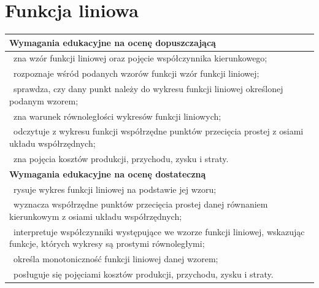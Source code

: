 \documentclass[12pt,a4paper]{article}
\begin{document}
	\section{Funkcja liniowa}
	
	\begin{longtable}{|p{16cm}|}
		\hline
		
		\textbf{Wymagania edukacyjne na ocenę dopuszczającą} \\ \hline
		
		\textbullet\ zna wzór funkcji liniowej oraz pojęcie współczynnika kierunkowego; \\
		
		\textbullet\ rozpoznaje wśród podanych wzorów funkcji wzór funkcji liniowej; \\
		
		\textbullet\ sprawdza, czy dany punkt należy do wykresu funkcji liniowej określonej podanym wzorem; \\
		
		\textbullet\ zna warunek równoległości wykresów funkcji liniowych; \\
		
		\textbullet\ odczytuje z wykresu funkcji współrzędne punktów przecięcia prostej z osiami układu współrzędnych; \\
		
		\textbullet\ zna pojęcia kosztów produkcji, przychodu, zysku i straty. \\ \hline
		
		\textbf{Wymagania edukacyjne na ocenę dostateczną} \\ \hline
		
		\textbullet\ rysuje wykres funkcji liniowej na podstawie jej wzoru; \\
		
		\textbullet\ wyznacza współrzędne punktów przecięcia prostej danej równaniem kierunkowym z osiami układu współrzędnych; \\
		
		\textbullet\ interpretuje współczynniki występujące we wzorze funkcji liniowej, wskazując funkcje, których wykresy są prostymi równoległymi; \\
		
		\textbullet\ określa monotoniczność funkcji liniowej danej wzorem; \\
		
		\textbullet\ posługuje się pojęciami kosztów produkcji, przychodu, zysku i straty. \\ \hline
		

\end{longtable}
\end{document}

